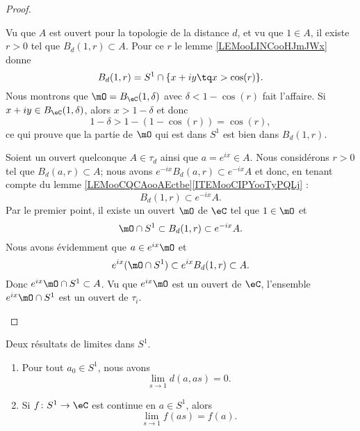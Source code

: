 \begin{proof}
\begin{subproof}
		\begin{subproof}
			\spitem[Si \( a=1\)]
			Vu que \( A\) est ouvert pour la topologie de la distance \( d\), et vu que \( 1\in A\), il existe \( r>0\) tel que \( B_d(1,r)\subset A\). Pour ce \( r\) le lemme \ref{LEMooLINCooHJmJWx} donne
			\begin{equation}
				B_d(1,r)=S^1\cap\{ x+iy\tq x>\cos(r) \}.
			\end{equation}
			Nous montrons que \( \mO=B_{\eC}(1,\delta)\) avec \( \delta<1-\cos(r)\) fait l'affaire. Si \( x+iy\in B_{\eC}(1,\delta)\), alors \( x>1-\delta\) et donc
			\begin{equation}
				1-\delta>1-(1-\cos(r))=\cos(r),
			\end{equation}
			ce qui prouve que la partie de \( \mO\) qui est dans \( S^1\) est bien dans \( B_d(1,r)\).
			\spitem[Si \( a\neq 1\)]

			Soient un ouvert quelconque \( A\in\tau_d\) ainsi que \( a= e^{ix}\in A\). Nous considérons \( r>0\) tel que \( B_d(a,r)\subset A\); nous avons \(  e^{-ix}B_d(a,r)\subset  e^{-ix}A\) et donc, en tenant compte du lemme \ref{LEMooCQCAooAEctbe}\ref{ITEMooCIPYooTyPQLj} :
			\begin{equation}
				B_d(1,r)\subset  e^{-ix}A.
			\end{equation}
			Par le premier point, il existe un ouvert \( \mO\) de \( \eC\) tel que \( 1\in \mO\) et
			\begin{equation}
				\mO\cap S^1\subset B_d(1,r)\subset  e^{-ix}A.
			\end{equation}
			Nous avons évidemment que \( a\in e^{ix}\mO\) et
			\begin{equation}
				e^{ix}(\mO\cap S^1)\subset  e^{ix}B_d(1,r)\subset A.
			\end{equation}
			Donc \(  e^{ix}\mO\cap S^1\subset A\). Vu que \(  e^{ix}\mO\) est un ouvert de \( \eC\), l'ensemble \(  e^{ix}\mO\cap S^1\) est un ouvert de \( \tau_i\).
		\end{subproof}
	\end{subproof}
\end{proof}

\begin{lemma}        \label{LEMooTKFHooJaeMyc}
	Deux résultats de limites dans \( S^1\).
	\begin{enumerate}
		\item       \label{ITEMooEUDIooDuynRg}
		      Pour tout \( a_0\in S^1\), nous avons
		      \begin{equation}
			      \lim_{s\to 1} d(a,as)=0.
		      \end{equation}
		\item       \label{ITEMooXCBUooUxQldB}
		      Si \( f\colon S^1\to \eC\) est continue en \( a\in S^1\), alors
		      \begin{equation}
			      \lim_{s\to 1} f(as)=f(a).
		      \end{equation}
	\end{enumerate}
\end{lemma}

